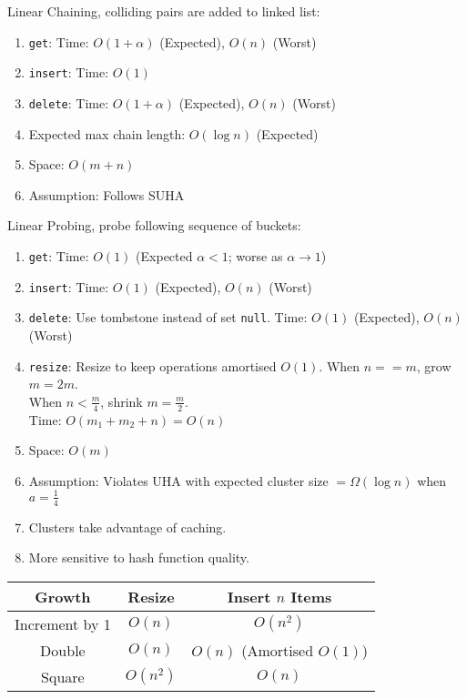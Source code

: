 \documentclass[12pt, a4paper]{article}
\begin{document}
\begin{multicols*}{3}
Linear Chaining, colliding pairs are added to linked list:
\begin{enumerate}[\roman*.]
  \item \lstinline|get|: Time: $O(1+\alpha)$ (Expected), $O(n)$ (Worst)
  \item \lstinline|insert|: Time: $O(1)$
  \item \lstinline|delete|: Time: $O(1+\alpha)$ (Expected), $O(n)$ (Worst)
  \item Expected max chain length: $O(\log n)$ (Expected)
  \item Space: $O(m+n)$
  \item Assumption: Follows SUHA
\end{enumerate}

Linear Probing, probe following sequence of buckets:
\begin{enumerate}[\roman*.]
  \item \lstinline|get|: Time: $O(1)$ (Expected $\alpha < 1$; worse as $\alpha \rightarrow 1$)
  \item \lstinline|insert|: Time: $O(1)$ (Expected), $O(n)$ (Worst)
  \item \lstinline|delete|: Use tombstone instead of set \lstinline|null|. Time: $O(1)$ (Expected), $O(n)$ (Worst)
  \item \lstinline|resize|: Resize to keep operations amortised $O(1)$. When $n == m$, grow $m=2m$.\\ When $n < \frac{m}{4}$, shrink $m=\frac{m}{2}$.\\Time: $O(m_1+m_2+n)=O(n)$
  \item Space: $O(m)$
  \item Assumption: Violates UHA with expected cluster size $= \Omega(\log n)$ when $a = \frac{1}{4}$ 
  \item Clusters take advantage of caching.
  \item More sensitive to hash function quality.
\end{enumerate}

\begin{center}
\begin{tabular}{|c|c|c|}
\hline
\textbf{Growth} & \textbf{Resize} & \textbf{Insert $n$ Items} \\
\hline
Increment by 1        & $O(n)$           & $O(n^2)$ \\
Double                & $O(n)$           & $O(n)$ (Amortised $O(1)$) \\
Square                & $O(n^2)$         & $O(n)$ \\
\hline
\end{tabular}
\end{center}


\end{multicols*}
\end{document}
